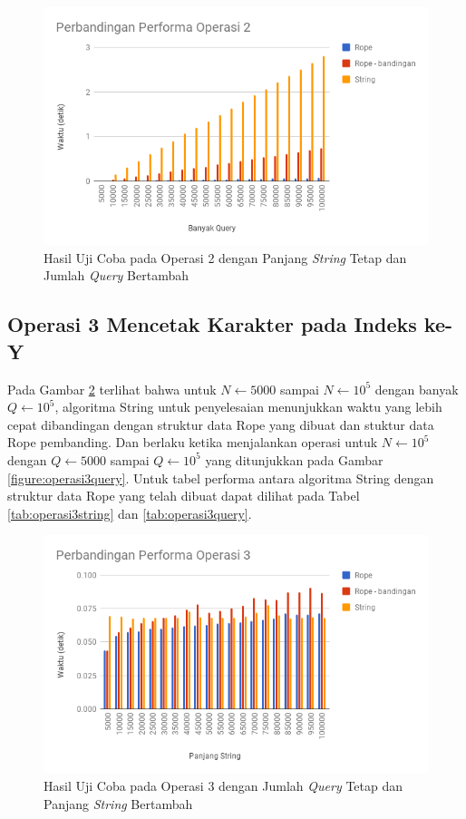 \begin{figure}
\centerline{ \includegraphics[scale=0.45]{assets/images/operasi2-query.png}}
\caption{Hasil Uji Coba pada Operasi 2 dengan Panjang \textit{String} Tetap dan Jumlah \textit{Query} Bertambah}
\label{figure:operasi2query}
\end{figure}

\subsection{Operasi 3 Mencetak Karakter pada Indeks ke-Y}
Pada Gambar \ref{figure:operasi3string} terlihat bahwa untuk $N \gets 5000$ sampai $N \gets 10^5$ dengan banyak $Q \gets 10^5$, algoritma String untuk penyelesaian \problem{} menunjukkan waktu yang lebih cepat dibandingan dengan struktur data Rope yang dibuat dan stuktur data Rope pembanding. Dan berlaku ketika menjalankan operasi untuk $N \gets 10^5$ dengan $Q \gets 5000$ sampai $Q \gets 10^5$ yang ditunjukkan pada Gambar \ref{figure:operasi3query}. Untuk tabel performa antara algoritma String dengan struktur data Rope yang telah dibuat dapat dilihat pada Tabel \ref{tab:operasi3string} dan \ref{tab:operasi3query}.

\begin{figure}
\centerline{ \includegraphics[scale=0.45]{assets/images/operasi3-string.png}}
\caption{Hasil Uji Coba pada Operasi 3 dengan Jumlah \textit{Query} Tetap dan Panjang \textit{String} Bertambah}
\label{figure:operasi3string}
\end{figure}

